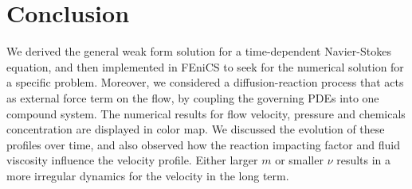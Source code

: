 \section{\fontsize{12}{12}\selectfont Conclusion}

We derived the general weak form solution for a time-dependent Navier-Stokes equation, and then implemented in FEniCS to seek for the numerical solution for a specific problem. Moreover, we considered a diffusion-reaction process that acts as external force term on the flow, by coupling the governing PDEs into one compound system. The numerical results for flow velocity, pressure and chemicals concentration are displayed in color map. We discussed the evolution of these profiles over time, and also observed how the reaction impacting factor and fluid viscosity influence the velocity profile. Either larger $m$ or smaller $\nu$ results in a more irregular dynamics for the velocity in the long term.


 
